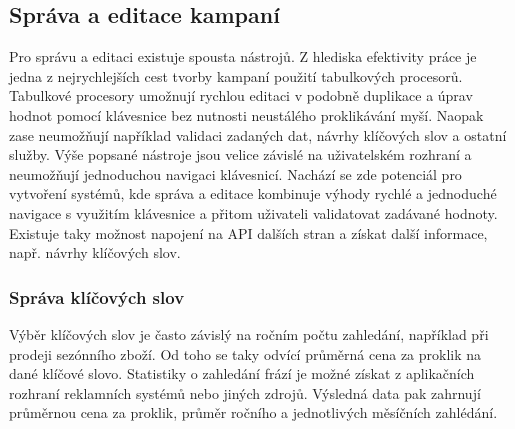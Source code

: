 \subsection{Správa a editace kampaní}
Pro správu a editaci existuje spousta nástrojů. Z hlediska efektivity práce je jedna z nejrychlejších cest tvorby kampaní použití tabulkových procesorů. Tabulkové procesory
umožnují rychlou editaci v podobně duplikace a úprav hodnot pomocí klávesnice bez nutnosti neustálého proklikávání myší. Naopak zase neumožňují například validaci
zadaných dat, návrhy klíčových slov a ostatní služby. Výše popsané nástroje jsou velice závislé na uživatelském rozhraní a neumožňují jednoduchou navigaci klávesnicí.
Nachází se zde potenciál pro vytvoření systémů, kde správa a editace kombinuje výhody rychlé a jednoduché navigace s využitím klávesnice a přitom uživateli validatovat
zadávané hodnoty. Existuje taky možnost napojení na API dalších stran a získat další informace, např. návrhy klíčových slov.

\subsubsection{Správa klíčových slov}
Výběr klíčových slov je často závislý na ročním počtu zahledání, například při prodeji sezónního zboží. Od toho se taky odvící průměrná cena za proklik
na dané klíčové slovo. Statistiky o zahledání frází je možné získat z aplikačních rozhraní reklamních systémů nebo jiných zdrojů. Výsledná data pak zahrnují
průměrnou cena za proklik, průměr ročního a jednotlivých měsíčních zahlédání.



\endinput